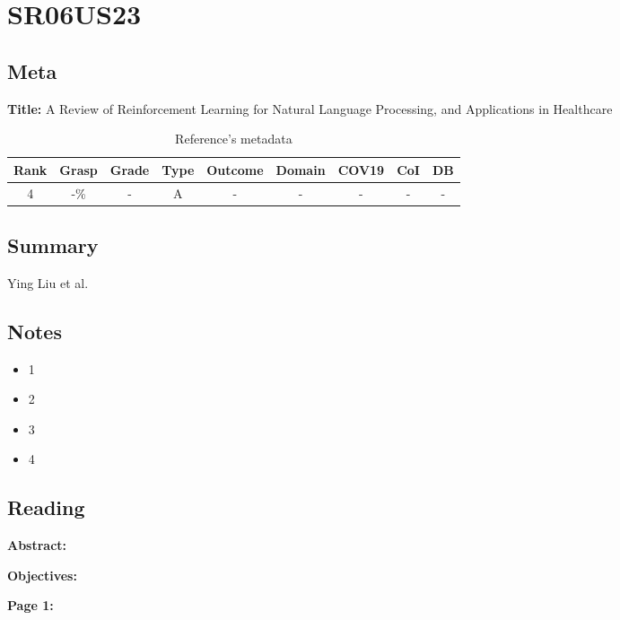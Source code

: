 \section{ SR06US23 }


\subsection{Meta}

    \textbf{Title:}
    A Review of Reinforcement Learning for Natural Language Processing, and Applications in Healthcare

    \begin{table}[H]
        \centering
        \begin{tabular}{|c|c|c|c|c|c|c|c|c|}
            \hline
                \textbf{Rank} & \textbf{Grasp} & \textbf{Grade} & \textbf{Type} & \textbf{Outcome} & \textbf{Domain} & \textbf{COV19} & \textbf{CoI} & \textbf{DB} \\
            \hline
                4 & -\% & - & A & - & - & - & - & - \\
            \hline
        \end{tabular}
        \caption{Reference's metadata}
        \label{tab:SR06US23}
    \end{table}

\subsection{Summary}
    Ying Liu et al. \cite{x090}

\subsection{Notes}
    \begin{itemize}
        \item 1
        \item 2
        \item 3
        \item 4
    \end{itemize}


\subsection{Reading}
    \textbf{Abstract:}

    
    \textbf{Objectives:}

    
    \textbf{Page 1:}
    